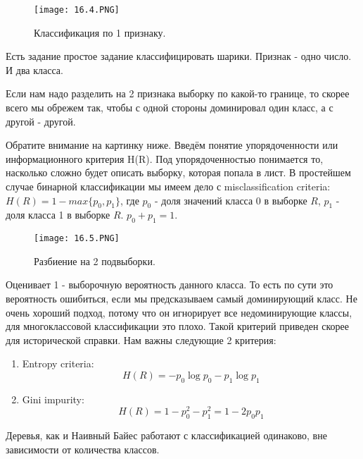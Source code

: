 \begin{figure}[h]
\centering
\texttt{[image: 16.4.PNG]}
\caption{Классификация по 1 признаку.}
\end{figure}

Есть задание простое задание классифицировать шарики. Признак - одно число. И два класса.



Если нам надо разделить на 2 признака выборку по какой-то границе, то скорее всего мы обрежем так, чтобы с одной стороны доминировал один класс, а с другой - другой.

Обратите внимание на картинку ниже. Введём понятие упорядоченности или информационного критерия H(R). Под упорядоченностью понимается то, насколько сложно будет описать выборку, которая попала в лист. В простейшем случае бинарной классификации мы имеем дело с misclassification criteria:
$H(R) = 1 - max\{p_0, p_1\}$, где $p_0$ - доля значений класса 0 в выборке $R$, $p_1$ - доля класса 1 в выборке $R$. $p_0 + p_1 = 1$. 

\begin{figure}[h]
\centering
\texttt{[image: 16.5.PNG]}
\caption{Разбиение на 2 подвыборки.}
\end{figure}

Оценивает 1 - выборочную вероятность данного класса. То есть по сути это вероятность ошибиться, если мы предсказываем самый доминирующий класс. Не очень хороший подход, потому что он игнорирует все недоминирующие классы, для многоклассовой классификации это плохо. Такой критерий приведен скорее для исторической справки. Нам важны следующие 2 критерия:
\begin{enumerate}
    \item  Entropy criteria:
$$H(R) = -p_0 \log p_0 - p_1 \log p_1 $$
    \item  Gini impurity:
$$H(R) = 1 - p_0^2 - p_1^2 = 1 - 2p_0p_1 $$
\end{enumerate}

Деревья, как и Наивный Байес работают с классификацией одинаково, вне зависимости от количества классов.